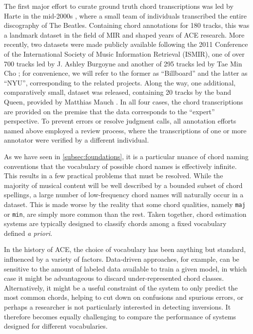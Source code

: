 The first major effort to curate ground truth chord transcriptions was led by Harte in the mid-2000s \cite{Isophonics}, where a small team of individuals transcribed the entire discography of The Beatles.
Containing chord annotations for 180 tracks, this was a landmark dataset in the field of MIR and shaped years of ACE research.
More recently, two datasets were made publicly available following the 2011 Conference of the International Society of Music Information Retrieval (ISMIR), one of over 700 tracks led by J. Ashley Burgoyne \cite{Burgoyne2011} and another of 295 tracks led by Tae Min Cho \cite{Cho2011b}; for convenience, we will refer to the former as ``Billboard'' and the latter as ``NYU'', corresponding to the related projects.
Along the way, one additional, comparatively small, dataset was released, containing 20 tracks by the band Queen, provided by Matthias Mauch \cite{Mauch2009x}.
In all four cases, the chord transcriptions are provided on the premise that the data corresponds to the ``expert'' perspective.
To prevent errors or resolve judgment calls, all annotation efforts named above employed a review process, where the transcriptions of one or more annotator were verified by a different individual.


As we have seen in \ref{subsec:foundations}, it is a particular nuance of chord naming conventions that the vocabulary of possible chord names is effectively infinite.
This results in a few practical problems that must be resolved.
While the majority of musical content will be well described by a bounded subset of chord spellings, a large number of low-frequency chord names will naturally occur in a dataset.
This is made worse by the reality that some chord qualities, namely \texttt{maj} or \texttt{min}, are simply more common than the rest.
Taken together, chord estimation systems are typically designed to classify chords among a fixed vocabulary defined \emph{a priori}.

In the history of ACE, the choice of vocabulary has been anything but standard, influenced by a variety of factors.
Data-driven approaches, for example, can be sensitive to the amount of labeled data available to train a given model, in which case it might be advantageous to discard under-represented chord classes.
Alternatively, it might be a useful constraint of the system to only predict the most common chords, helping to cut down on confusions and spurious errors, or perhaps a researcher is not particularly interested in detecting inversions.
It therefore becomes equally challenging to compare the performance of systems designed for different vocabularies.

